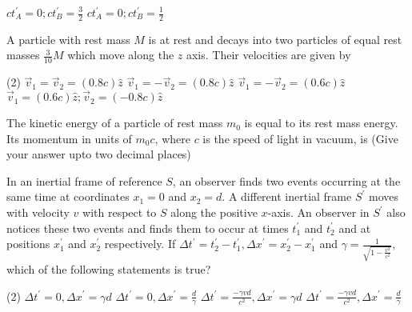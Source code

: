 \begin{enumerate}
\begin{tasks}
	\task[\textbf{C.}]$c t_{A}^{\prime}=0 ; c t_{B}^{\prime}=\frac{3}{2}$
	\task[\textbf{D.}] $c t_{A}^{\prime}=0 ; c t_{B}^{\prime}=\frac{1}{2}$
\end{tasks}
\begin{minipage}{\textwidth}
	\item A particle with rest mass $M$ is at rest and decays into two particles of equal rest masses $\frac{3}{10} M$ which move along the $z$ axis. Their velocities are given by
\end{minipage}
\begin{tasks}(2)
	\task[\textbf{A.}] $\vec{v}_{1}=\vec{v}_{2}=(0.8 c) \hat{z}$
	\task[\textbf{B.}]$\vec{v}_{1}=-\vec{v}_{2}=(0.8 c) \hat{z}$
	\task[\textbf{C.}]$\vec{v}_{1}=-\vec{v}_{2}=(0.6 c) \hat{z}$
	\task[\textbf{D.}]$\vec{v}_{1}=(0.6 c) \hat{z} ; \vec{v}_{2}=(-0.8 c) \hat{z}$
\end{tasks}
\begin{minipage}{\textwidth}
	\item The kinetic energy of a particle of rest mass $m_{0}$ is equal to its rest mass energy. Its momentum in units of $m_{0} c$, where $c$ is the speed of light in vacuum, is
	(Give your answer upto two decimal places)
\end{minipage}
\begin{minipage}{\textwidth}
	\item In an inertial frame of reference $S$, an observer finds two events occurring at the same time at coordinates $x_{1}=0$ and $x_{2}=d$. A different inertial frame $S^{\prime}$ moves with velocity $v$ with respect to $S$ along the positive $x$-axis. An observer in $S^{\prime}$ also notices these two events and finds them to occur at times $t_{1}^{\prime}$ and $t_{2}^{\prime}$ and at positions $x_{1}^{\prime}$ and $x_{2}^{\prime}$ respectively.
	If $\Delta t^{\prime}=t_{2}^{\prime}-t_{1}^{\prime}, \Delta x^{\prime}=x_{2}^{\prime}-x_{1}^{\prime}$ and $\gamma=\frac{1}{\sqrt{1-\frac{v^{2}}{c^{2}}}}$, which of the following statements is true?
\end{minipage}
\begin{tasks}(2)
	\task[\textbf{A.}] $\Delta t^{\prime}=0, \Delta x^{\prime}=\gamma d$
	\task[\textbf{B.}] $\Delta t^{\prime}=0, \Delta x^{\prime}=\frac{d}{\gamma}$
	\task[\textbf{C.}]$\Delta t^{\prime}=\frac{-\gamma v d}{c^{2}}, \Delta x^{\prime}=\gamma d$
	\task[\textbf{D.}] $\Delta t^{\prime}=\frac{-\gamma v d}{c^{2}}, \Delta x^{\prime}=\frac{d}{\gamma}$
\end{tasks}

\end{enumerate}
